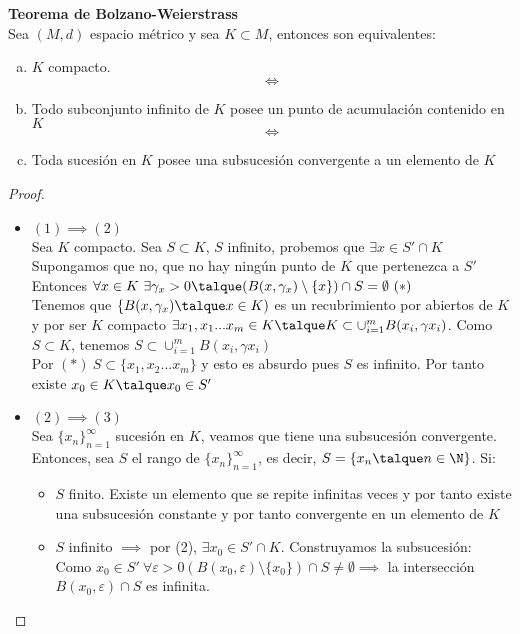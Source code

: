 	\begin{teor} \textbf{Teorema de Bolzano-Weierstrass}\\
		Sea $(M,d)$ espacio métrico y sea $K\subset M$, entonces son equivalentes:
			\begin{enumerate}[(a)]
				\item $K$ compacto.
					\[\iff\]
				\item Todo subconjunto infinito de $K$ posee un punto de acumulación contenido en $K$
					\[\iff\]
				\item Toda sucesión en $K$ posee una subsucesión convergente a un elemento de $K$
			\end{enumerate}
		\begin{proof}\ 
			\begin{itemize}
				\item $(1)\implies(2)$\\
					Sea $K$ compacto. Sea $S\subset K$, $S$ infinito, probemos que $\exists x\in S'\cap K$\\
	Supongamos que no, que no hay ningún punto de $K$ que pertenezca a $S'$\\
	Entonces $\forall x\in K\ \exists\gamma_x>0\talque (B(x,\gamma_x)\setminus\{x\})\cap S=\emptyset\ (*)$\\
	Tenemos que $\{B(x,\gamma_x)\talque x\in K)$ es un recubrimiento por abiertos de $K$ y por ser $K$ compacto $\exists x_1,x_1...x_m\in K\talque K\subset\cup^m_{i=1}B(x_i,\gamma{x_i})$. Como $S\subset K$, tenemos $S\subset \cup^m_{i=1}B(x_i,\gamma{x_i})$\\
	Por $(*)\ S\subset\{x_1,x_2...x_m\}$ y esto es absurdo pues $S$ es infinito. Por tanto existe $x_0 \in K\talque x_0\in S'$
				\item $(2)\implies(3)$\\
	Sea $\{x_n\}^\infty_{n=1}$ sucesión en $K$, veamos que tiene una subsucesión convergente.
	Entonces, sea $S$ el rango de $\{x_n\}^\infty_{n=1}$, es decir, $S=\{x_n\talque n\in\N\}$. Si:
					\begin{itemize}
						\item $S$ finito. Existe un elemento que se repite infinitas veces y por tanto existe una subsucesión constante y por tanto convergente en un elemento de $K$
						\item $S$ infinito $\implies$ por (2), $\exists x_0\in S'\cap K$. Construyamos la subsucesión:\\
	Como $x_0\in S'\ \forall \varepsilon>0 (B(x_0,\varepsilon)\setminus\{x_0\})\cap S \neq\emptyset\implies$ la intersección $B(x_0,\varepsilon)\cap S$ es infinita.					

\end{itemize}
\end{itemize}
\end{proof}
\end{teor}
